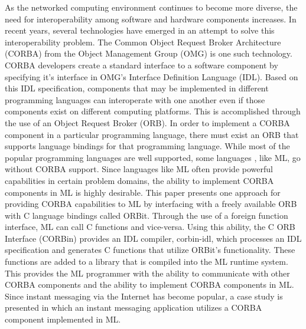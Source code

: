
\singlespace

As the networked computing environment continues to become more diverse, 
the need for interoperability among software and hardware components increases.
In recent years, several technologies have emerged in an attempt to solve this 
interoperability problem.  The Common Object Request Broker Architecture (CORBA)
from the Object Management Group (OMG) is one such technology.  CORBA developers
create a standard interface to a software component by specifying it's interface
in OMG's Interface Definition Language (IDL).   Based on this IDL specification,
components that may be implemented in different programming languages can 
interoperate with one another even if those components exist on different 
computing platforms. This is accomplished through the use of an Object Request 
Broker (ORB).  In order to implement a CORBA component in a particular programming
language, there must exist an ORB that supports language bindings for that 
programming language.   While most of the popular programming languages are well 
supported, some languages , like ML, go without CORBA support.   Since languages 
like ML often provide powerful capabilities in certain problem domains,  the 
ability to implement CORBA components in ML is highly desirable.  This paper 
presents one approach for providing CORBA capabilities to ML by interfacing with 
a freely available ORB with C language bindings called ORBit.  Through the use 
of a foreign function interface, ML can call C functions and vice-versa.  Using 
this ability, the C ORB Interface (CORBin) provides an IDL compiler, corbin-idl,  
which processes an IDL specification and generates C functions that utilize 
ORBit's functionality.  These functions are added to a library that is compiled 
into the ML runtime system.  This provides the ML programmer with the ability to  
communicate with other CORBA components and the ability to implement CORBA 
components in ML. Since instant messaging via the Internet has become popular, 
a case study is presented in which an instant messaging application utilizes a 
CORBA component implemented in ML.  

\doublespace
